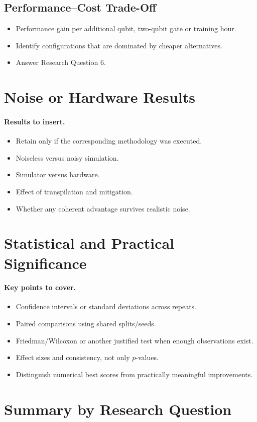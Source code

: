 \documentclass[]{UCD_CS_MSc_AAI_Report}
\newcommand{\sectionbrief}{\paragraph{Key points to cover.}}
\newcommand{\resultplaceholder}{\paragraph{Results to insert.}}
\begin{document}
\subsection{Performance--Cost Trade-Off}
\begin{itemize}
    \item Performance gain per additional qubit, two-qubit gate or training hour.
    \item Identify configurations that are dominated by cheaper alternatives.
    \item Answer Research Question 6.
\end{itemize}

\section{Noise or Hardware Results}
\label{sec:results-noise}

\resultplaceholder
\begin{itemize}
    \item Retain only if the corresponding methodology was executed.
    \item Noiseless versus noisy simulation.
    \item Simulator versus hardware.
    \item Effect of transpilation and mitigation.
    \item Whether any coherent advantage survives realistic noise.
\end{itemize}

\section{Statistical and Practical Significance}
\label{sec:results-significance}

\sectionbrief
\begin{itemize}
    \item Confidence intervals or standard deviations across repeats.
    \item Paired comparisons using shared splits/seeds.
    \item Friedman/Wilcoxon or another justified test when enough observations exist.
    \item Effect sizes and consistency, not only $p$-values.
    \item Distinguish numerical best scores from practically meaningful improvements.
\end{itemize}

\section{Summary by Research Question}
\label{sec:results-rq-summary}
\end{document}
